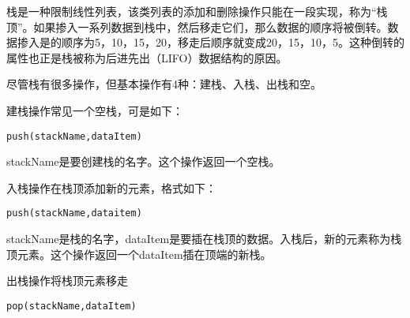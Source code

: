 栈是一种限制线性列表，该类列表的添加和删除操作只能在一段实现，称为“栈顶”。如果掺入一系列数据到栈中，然后移走它们，那么数据的顺序将被倒转。数据掺入是的顺序为5，10，15，20，移走后顺序就变成20，15，10，5。这种倒转的属性也正是栈被称为后进先出（LIFO）数据结构的原因。

尽管栈有很多操作，但基本操作有4种：建栈、入栈、出栈和空。

建栈操作常见一个空栈，可是如下：
\begin{verbatim}
push(stackName,dataItem)
\end{verbatim}
stackName是要创建栈的名字。这个操作返回一个空栈。

入栈操作在栈顶添加新的元素，格式如下：
\begin{verbatim}
push(stackName,dataitem)
\end{verbatim}
stackName是栈的名字，dataItem是要插在栈顶的数据。入栈后，新的元素称为栈顶元素。这个操作返回一个dataItem插在顶端的新栈。

出栈操作将栈顶元素移走
\begin{verbatim}
pop(stackName,dataItem)
\end{verbatim}
